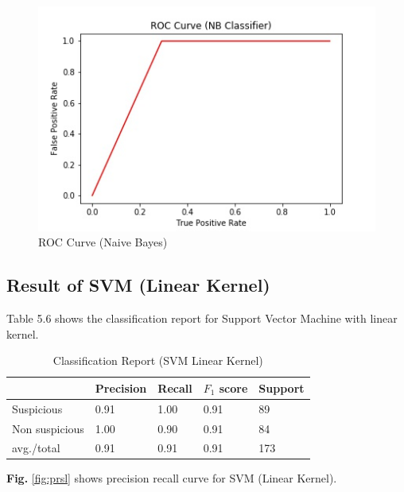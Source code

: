 \documentclass[12pt,a4paper]{report}
\begin{document}
\begin{figure}[h!]
    \centering
    \includegraphics[scale=0.58]{Figures/ROCN.jpg}
    \caption{ROC Curve (Naive Bayes)}
    \label{fig:rocn}
\end{figure}


\subsection{Result of SVM (Linear Kernel)}
Table 5.6 shows the classification report for Support Vector Machine with linear kernel.

\begin{table}[h!]
\begin{center}
\caption{Classification Report (SVM Linear Kernel)}
\begin{tabular}{|m{4.4cm} | m{2cm}| m{2cm}| m{2cm}| m{2cm}|}
\hline
     & Precision & Recall & $F_1$ score & Support \\
\hline
     Suspicious & 0.91 & 1.00 & 0.91 & 89\\
\hline 
     Non suspicious  & 1.00 & 0.90 & 0.91 & 84\\
\hline 
     avg./total & 0.91 & 0.91 & 0.91 & 173\\
\hline
\end{tabular}
\end{center}
\end{table}

\noindent
\textbf{Fig.} \ref{fig:prsl} shows precision recall curve for SVM (Linear Kernel).
\end{document}
